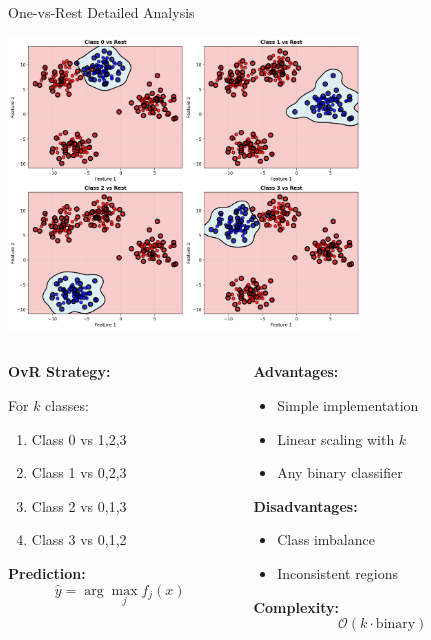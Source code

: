 \documentclass[8pt,aspectratio=1610]{beamer}
\begin{document}
\begin{frame}{One-vs-Rest Detailed Analysis}
\begin{center}
\includegraphics[width=0.7\textwidth]{../figures/ovr_detailed.png}
\end{center}

\begin{columns}[t]
\begin{column}{0.48\textwidth}
\textbf{OvR Strategy:}

For $k$ classes:
\begin{enumerate}
\setlength{\itemsep}{0pt}
\item Class 0 vs {1,2,3}
\item Class 1 vs {0,2,3}
\item Class 2 vs {0,1,3}
\item Class 3 vs {0,1,2}
\end{enumerate}

\textbf{Prediction:}
$$\hat{y} = \arg\max_{j} f_j(x)$$
\end{column}

\begin{column}{0.48\textwidth}
\textbf{Advantages:}
\begin{itemize}
\setlength{\itemsep}{0pt}
\item Simple implementation
\item Linear scaling with $k$
\item Any binary classifier
\end{itemize}

\textbf{Disadvantages:}
\begin{itemize}
\setlength{\itemsep}{0pt}
\item Class imbalance
\item Inconsistent regions
\end{itemize}

\textbf{Complexity:}
$$\mathcal{O}(k \cdot \text{binary})$$
\end{column}
\end{columns}
\end{frame}
\end{document}
